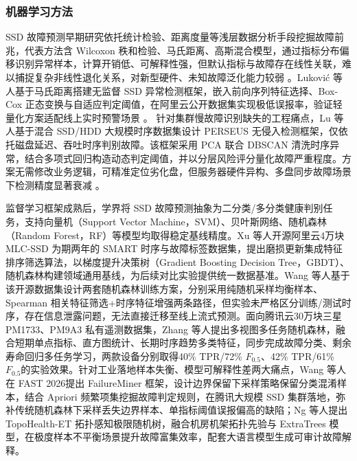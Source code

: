\subsubsection{机器学习方法}
SSD 故障预测早期研究依托统计检验、距离度量等浅层数据分析手段挖掘故障前兆，代表方法含 Wilcoxon 秩和检验、马氏距离、高斯混合模型，通过指标分布偏移识别异常样本，计算开销低、可解释性强，但默认指标与故障存在线性关联，难以捕捉复杂非线性退化关系，对新型硬件、未知故障泛化能力较弱 \cite {hughes2002improved,wang2011health,queiroz2016fault}。Lukovi\'c 等人基于马氏距离搭建无监督 SSD 异常检测框架，嵌入前向序列特征选择、Box-Cox 正态变换与自适应判定阈值，在阿里云公开数据集实现极低误报率，验证轻量化方案适配线上实时预警场景 \cite {lukovic2025solid}。
针对集群慢故障识别缺失的工程痛点，Lu 等人基于混合 SSD/HDD 大规模时序数据集设计 PERSEUS 无侵入检测框架，仅依托磁盘延迟、吞吐时序判别故障。该框架采用 PCA 联合 DBSCAN 清洗时序异常，结合多项式回归构造动态判定阈值，并以分层风险评分量化故障严重程度。方案无需修改业务逻辑，可精准定位劣化盘，但服务器硬件异构、多盘同步故障场景下检测精度显著衰减 \cite {lu2023perseus}。

监督学习框架成熟后，学界将 SSD 故障预测抽象为二分类/多分类健康判别任务，支持向量机（Support Vector Machine，SVM）、贝叶斯网络、随机森林（Random Forest，RF）等模型均取得稳定基线精度\cite{murray2005machine,hamerly2001bayesian,chaves2016banhfap,li2014hard,zhang2023multi}。Xu 等人开源阿里云4万块 MLC-SSD 为期两年的 SMART 时序与故障标签数据集，提出磨损更新集成特征排序筛选算法，以梯度提升决策树（Gradient Boosting Decision Tree，GBDT）、随机森林构建领域通用基线，为后续对比实验提供统一数据基准\cite{xu2021general}。Wang 等人基于该开源数据集设计两套随机森林训练方案，分别采用纯随机采样均衡样本、Spearman 相关特征筛选+时序特征增强两条路径，但实验未严格区分训练/测试时序，存在信息泄露问题，无法直接迁移至线上流式预测\cite{wang2022ssd}。面向腾讯云30万块三星 PM1733、PM9A3 私有遥测数据集，Zhang 等人提出多视图多任务随机森林，融合短期单点指标、直方图统计、长期时序趋势多类特征，同步完成故障分类、剩余寿命回归多任务学习，两款设备分别取得40\% TPR/72\% $F_{0.5}$、42\% TPR/61\% $F_{0.5}$的实验效果\cite{zhang2023multi}。针对工业落地样本失衡、模型可解释性差两大痛点，Wang 等人在 FAST 2026提出 FailureMiner 框架，设计边界保留下采样策略保留分类混淆样本，结合 Apriori 频繁项集挖掘故障判定规则，在腾讯大规模 SSD 集群落地，弥补传统随机森林下采样丢失边界样本、单指标阈值误报偏高的缺陷\cite{wang2026failureminer}；Ng 等人提出 TopoHealth-ET 拓扑感知极限随机树，融合机房机架拓扑先验与 ExtraTrees 模型，在极度样本不平衡场景提升故障富集效率，配套大语言模型生成可审计故障解释\cite{ng2026topology}。

